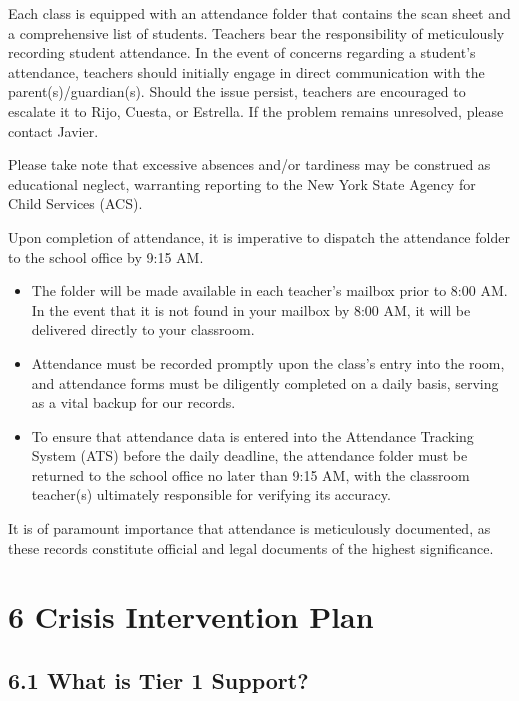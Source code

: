 \documentclass[11pt]{article}
\begin{document}
Each class is equipped with an attendance folder that contains the scan sheet and a comprehensive list of students. Teachers bear the responsibility of meticulously recording student attendance. In the event of concerns regarding a student’s attendance, teachers should initially engage in direct communication with the parent(s)/guardian(s). Should the issue persist, teachers are encouraged to escalate it to Rijo, Cuesta, or Estrella. If the problem remains unresolved, please contact Javier.

Please take note that excessive absences and/or tardiness may be construed as educational neglect, warranting reporting to the New York State Agency for Child Services (ACS).

Upon completion of attendance, it is imperative to dispatch the attendance folder to the school office by 9:15 AM.

\begin{itemize}
\item The folder will be made available in each teacher’s mailbox prior to 8:00 AM. In the event that it is not found in your mailbox by 8:00 AM, it will be delivered directly to your classroom.

\item Attendance must be recorded promptly upon the class’s entry into the room, and attendance forms must be diligently completed on a daily basis, serving as a vital backup for our records.

\item To ensure that attendance data is entered into the Attendance Tracking System (ATS) before the daily deadline, the attendance folder must be returned to the school office no later than 9:15 AM, with the classroom teacher(s) ultimately responsible for verifying its accuracy.
\end{itemize}

It is of paramount importance that attendance is meticulously documented, as these records constitute official and legal documents of the highest significance.
\section{6 Crisis Intervention Plan}
\label{sec:org59c1722}

\subsection{6.1 What is Tier 1 Support?}
\label{sec:org5245db1}
\end{document}
